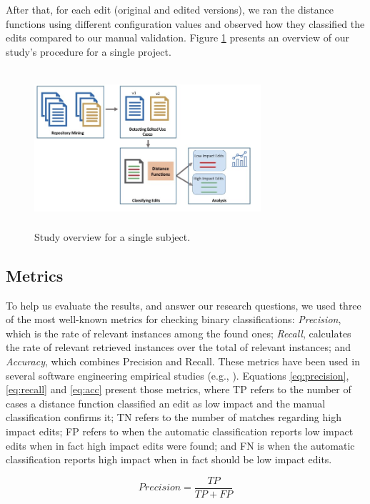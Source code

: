 After that, for each edit (original and edited versions), we ran the distance functions using different configuration values and observed how they classified the edits compared to our manual validation. Figure \ref{fig:overview} presents an overview of our study's procedure for a single project.

\begin{figure}[h]
\centering
\includegraphics[height=2.3in,width=3.3in]{figs/overview.jpg}
\caption{Study overview for a single subject.}
\label{fig:overview}
\end{figure}

\subsection{Metrics}

To help us evaluate the results, and answer our research questions, we used three of the most well-known metrics for checking binary classifications: \textit{Precision}, which is the rate of relevant instances among the found ones; \textit{Recall}, calculates the rate of relevant retrieved instances over the total of relevant instances; and \textit{Accuracy}, which combines Precision and Recall. These metrics have been used in several software engineering empirical studies (e.g., \cite{nagappan2008influence,hayes2005text, elish2008predicting}). Equations \ref{eq:precision}, \ref{eq:recall} and \ref{eq:acc} present those metrics, where TP refers to the number of cases a distance function classified an edit as low impact and the manual classification confirms it; TN refers to the number of matches regarding high impact edits; FP refers to when the automatic classification reports low impact edits when in fact high impact edits were found; and FN is when the automatic classification reports  high impact when in fact should be low impact edits.   

\begin{equation} \label{eq:precision}
Precision = \frac{TP}{TP+FP}
\end{equation}

